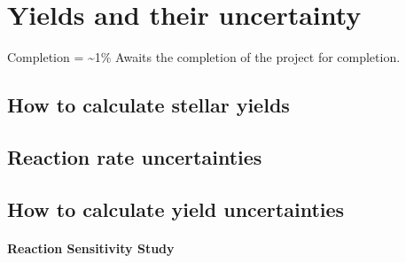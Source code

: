 \chapter{Yields and their uncertainty}

Completion = \sim1\%
Awaits the completion of the project for completion.

\section{How to calculate stellar yields}

\section{Reaction rate uncertainties}

\section{How to calculate yield uncertainties}

\subsubsection{Reaction Sensitivity Study}
